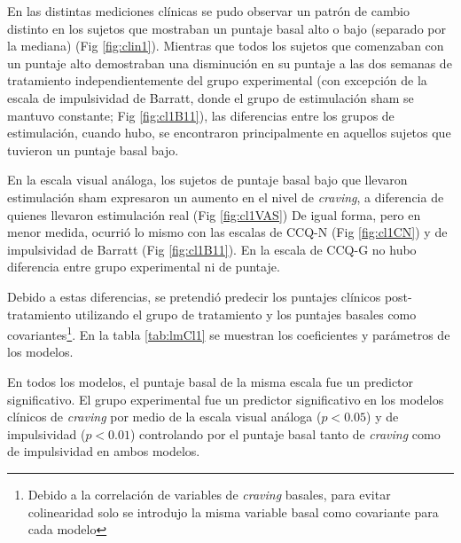 En las distintas mediciones clínicas se pudo observar un patrón de cambio distinto en los sujetos que mostraban un puntaje basal alto o bajo (separado por la mediana) (Fig \ref{fig:clin1}). Mientras que todos los sujetos que comenzaban con un puntaje alto demostraban una disminución en su puntaje a las dos semanas de tratamiento independientemente del grupo experimental (con excepción de la escala de impulsividad de Barratt, donde el grupo de estimulación sham se mantuvo constante; Fig \ref{fig:cl1B11}), las diferencias entre los grupos de estimulación, cuando hubo, se encontraron principalmente en aquellos sujetos que tuvieron un puntaje basal bajo. \par
En la escala visual análoga, los sujetos de puntaje basal bajo que llevaron estimulación sham expresaron un aumento en el nivel de \textit{craving}, a diferencia de quienes llevaron estimulación real (Fig \ref{fig:cl1VAS}) De igual forma, pero en menor medida, ocurrió lo mismo con las escalas de CCQ-N (Fig \ref{fig:cl1CN}) y de impulsividad de Barratt (Fig \ref{fig:cl1B11}). En la escala de CCQ-G no hubo diferencia entre grupo experimental ni de puntaje. \par

Debido a estas diferencias, se pretendió predecir los puntajes clínicos post-tratamiento utilizando el grupo de tratamiento y los puntajes basales como covariantes\footnote{Debido a la correlación de variables de \textit{craving} basales, para evitar colinearidad solo se introdujo la misma variable basal como covariante para cada modelo}. En la tabla \ref{tab:lmCl1} se muestran los coeficientes y parámetros de los modelos. \par
En todos los modelos, el puntaje basal de la misma escala fue un predictor significativo. El grupo experimental fue un predictor significativo en los modelos clínicos de \textit{craving} por medio de la escala visual análoga ($p<0.05$) y de impulsividad ($p<0.01$) controlando por el puntaje basal tanto de \textit{craving} como de impulsividad en ambos modelos.

